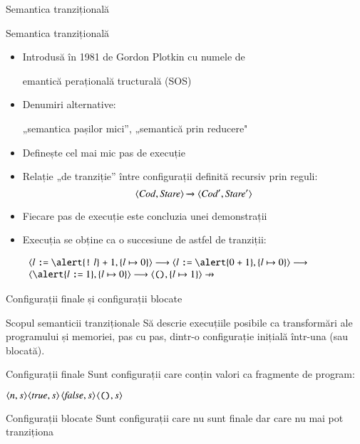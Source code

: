 \documentclass[xcolor=pdftex,romanian,colorlinks]{beamer}
\begin{document}
\begin{section}{Semantica tranzițională}
\begin{frame}{Semantica tranzițională}{}
\begin{itemize}
\item Introdusă în 1981 de Gordon Plotkin cu numele de 

\hfill  {}emantică perațională tructurală (SOS) \hfill \;
\item Denumiri alternative: 

\hfill „semantica pașilor mici”, „semantică prin reducere"\hfill \;
\item Definește cel mai mic pas de execuție 
\item Relație „de tranziție” între configurații definită recursiv prin reguli:
$$\displaystyle{\ensuremath {{\langle{{\it Cod}, {\it Stare}}\rangle}} \xrightarrow{} {{\ensuremath \langle{{\it Cod'}, {\it Stare'}}\rangle}}}$$
\item Fiecare pas de execuție este concluzia unei demonstrații
\item Execuția se obține ca o succesiune de astfel de tranziții:

$\begin{array}{l}
\c{l \terminal{:=} \alert{\terminal{!} l} \terminal{+} 1,\{l \mapsto 0\}}
\longrightarrow
\c{l \terminal{:=} \alert{0 \terminal{+} 1},\{l \mapsto 0\}}
\longrightarrow
\\
\c{\alert{l \terminal{:=} 1},\{l \mapsto 0\}}
\longrightarrow
\c{\Sskip,\{l \mapsto 1\}}\not\rightarrow
\end{array}$
\end{itemize}
\end{frame}


\begin{frame}{Configurații finale și configurații blocate}

\begin{block}{Scopul semanticii tranziționale}
Să descrie execuțiile posibile ca transformări ale programului și memoriei, pas cu pas, dintr-o configurație inițială într-una  (sau \alert{blocată}).
\end{block}

\begin{block}{Configurații finale}
Sunt configurații care conțin valori ca fragmente de program:

\hfill ${\langle{n, s}\rangle}$\hfill ${\langle{{\it true}, s}\rangle}$\hfill ${\langle{{\it false},s}\rangle}$\hfill ${\langle{\ensuremath\mathrel{\text{\ttfamily ()}},s}\rangle}$\hfill\;
\end{block}

\begin{alertblock}{Configurații blocate}
Sunt configurații care nu sunt finale dar care nu mai pot tranziționa


\end{alertblock}
\end{frame}
\end{section}
\end{document}
